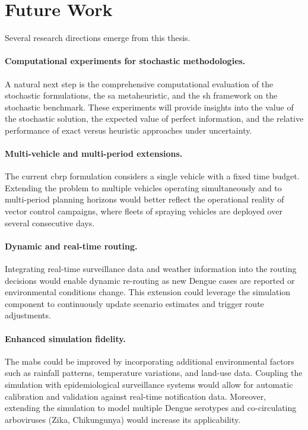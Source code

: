 \section{Future Work}

Several research directions emerge from this thesis.

\paragraph{Computational experiments for stochastic methodologies.}
A natural next step is the comprehensive computational evaluation of the
stochastic formulations, the \gls{sa} metaheuristic, and the \gls{sh}
framework on the stochastic benchmark. These experiments will provide
insights into the value of the stochastic solution, the expected value of
perfect information, and the relative performance of exact versus heuristic
approaches under uncertainty.

\paragraph{Multi-vehicle and multi-period extensions.}
The current \gls{cbrp} formulation considers a single vehicle with a fixed
time budget. Extending the problem to multiple vehicles operating simultaneously
and to multi-period planning horizons would better reflect the operational
reality of vector control campaigns, where fleets of spraying vehicles are
deployed over several consecutive days.

\paragraph{Dynamic and real-time routing.}
Integrating real-time surveillance data and weather information into the
routing decisions would enable dynamic re-routing as new Dengue cases are
reported or environmental conditions change. This extension could leverage the
simulation component to continuously update scenario estimates and trigger
route adjustments.

\paragraph{Enhanced simulation fidelity.}
The \gls{mabs} could be improved by incorporating additional environmental
factors such as rainfall patterns, temperature variations, and land-use data.
Coupling the simulation with epidemiological surveillance systems would allow
for automatic calibration and validation against real-time notification data.
Moreover, extending the simulation to model multiple Dengue serotypes and
co-circulating arboviruses (Zika, Chikungunya) would increase its applicability.

